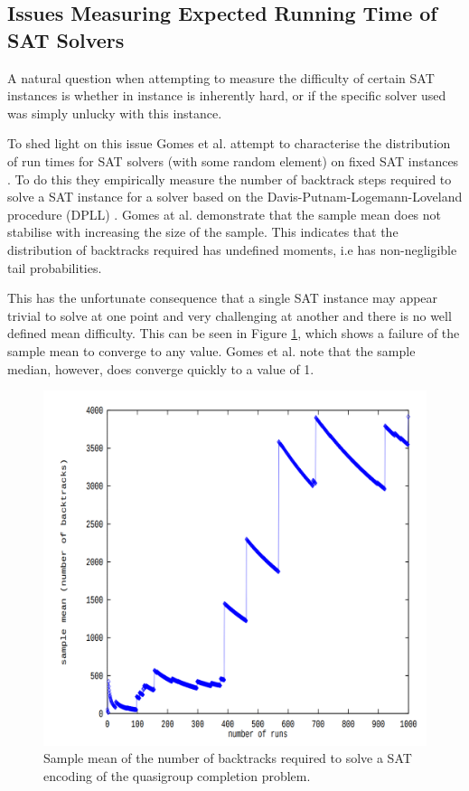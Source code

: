 \subsection{Issues Measuring Expected Running Time of SAT Solvers}
A natural question when attempting to measure the difficulty of certain SAT instances
is whether in instance is inherently hard, or if the specific solver used was simply
unlucky with this instance.

To shed light on this issue Gomes et al. attempt to characterise
the distribution of run times for SAT solvers (with some random element)
on fixed SAT instances \cite{gomes2000heavy}. To do this they empirically measure
the number of backtrack steps required
to solve a SAT instance for a solver based on the Davis-Putnam-Logemann-Loveland procedure (DPLL)
\cite{davis1962machine}.
Gomes at al. demonstrate that the sample mean does not stabilise
with increasing the size of the sample.
This indicates that the distribution of backtracks required
has undefined moments, i.e has non-negligible tail probabilities.

This has the unfortunate consequence that a single SAT instance may appear
trivial to solve at one point and very challenging at another and there is no
well defined mean difficulty. This can be seen in Figure \ref{fig:erratic_mean}, which
shows a failure of the sample mean to converge to any value. Gomes et al. note
that the sample median, however, does converge quickly to a value of 1.

\begin{figure}[hb]
    \centering
    \includegraphics[scale=0.17]{sample_mean_backtracks.png}
    \caption[Sample mean of backtracks]{Sample mean of the number of backtracks required to solve a SAT encoding of the quasigroup completion problem.}
    \label{fig:erratic_mean}
\end{figure}



